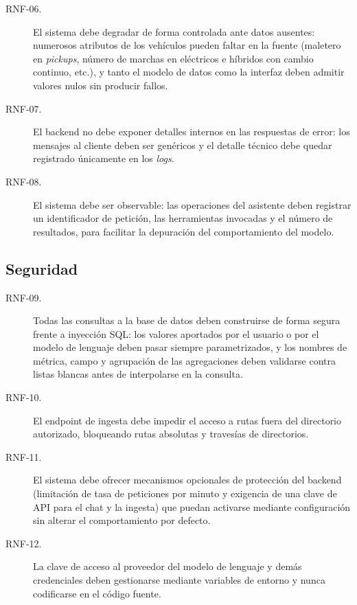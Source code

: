 \begin{description}
  \item[RNF-06.] El sistema debe degradar de forma controlada ante datos
        ausentes: numerosos atributos de los vehículos pueden faltar en la
        fuente (maletero en \emph{pickups}, número de marchas en eléctricos e
        híbridos con cambio continuo, etc.), y tanto el modelo de datos como la
        interfaz deben admitir valores nulos sin producir fallos.

  \item[RNF-07.] El backend no debe exponer detalles internos en las respuestas
        de error: los mensajes al cliente deben ser genéricos y el detalle
        técnico debe quedar registrado únicamente en los \emph{logs}.

  \item[RNF-08.] El sistema debe ser observable: las operaciones del asistente
        deben registrar un identificador de petición, las herramientas
        invocadas y el número de resultados, para facilitar la depuración del
        comportamiento del modelo.
\end{description}

\subsection{Seguridad}

\begin{description}
  \item[RNF-09.] Todas las consultas a la base de datos deben construirse de
        forma segura frente a inyección SQL: los valores aportados por el
        usuario o por el modelo de lenguaje deben pasar siempre parametrizados,
        y los nombres de métrica, campo y agrupación de las agregaciones deben
        validarse contra listas blancas antes de interpolarse en la consulta.

  \item[RNF-10.] El endpoint de ingesta debe impedir el acceso a rutas fuera
        del directorio autorizado, bloqueando rutas absolutas y travesías de
        directorios.

  \item[RNF-11.] El sistema debe ofrecer mecanismos opcionales de protección
        del backend (limitación de tasa de peticiones por minuto y exigencia de
        una clave de API para el chat y la ingesta) que puedan activarse
        mediante configuración sin alterar el comportamiento por defecto.

  \item[RNF-12.] La clave de acceso al proveedor del modelo de lenguaje y demás
        credenciales deben gestionarse mediante variables de entorno y nunca
        codificarse en el código fuente.
\end{description}

